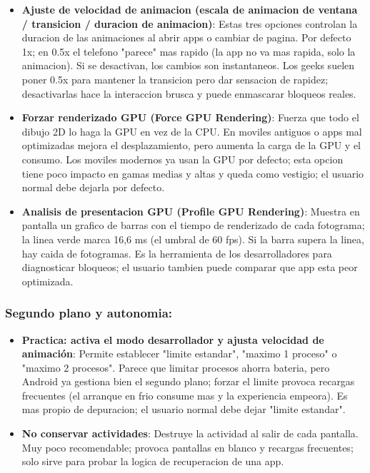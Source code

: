 \begin{itemize}
  \item \textbf{Ajuste de velocidad de animacion (escala de animacion de ventana / transicion / duracion de animacion)}: Estas tres opciones controlan la duracion de las animaciones al abrir apps o cambiar de pagina. Por defecto 1x; en 0.5x el telefono "parece" mas rapido (la app no va mas rapida, solo la animacion). Si se desactivan, los cambios son instantaneos. Los geeks suelen poner 0.5x para mantener la transicion pero dar sensacion de rapidez; desactivarlas hace la interaccion brusca y puede enmascarar bloqueos reales.
  \item \textbf{Forzar renderizado GPU (Force GPU Rendering)}: Fuerza que todo el dibujo 2D lo haga la GPU en vez de la CPU. En moviles antiguos o apps mal optimizadas mejora el desplazamiento, pero aumenta la carga de la GPU y el consumo. Los moviles modernos ya usan la GPU por defecto; esta opcion tiene poco impacto en gamas medias y altas y queda como vestigio; el usuario normal debe dejarla por defecto.
  \item \textbf{Analisis de presentacion GPU (Profile GPU Rendering)}: Muestra en pantalla un grafico de barras con el tiempo de renderizado de cada fotograma; la linea verde marca 16,6 ms (el umbral de 60 fps). Si la barra supera la linea, hay caida de fotogramas. Es la herramienta de los desarrolladores para diagnosticar bloqueos; el usuario tambien puede comparar que app esta peor optimizada.
\end{itemize}

\subsubsection*{Segundo plano y autonomia:}

\begin{itemize}
  \item \textbf{Practica: activa el modo desarrollador y ajusta velocidad de animación}: Permite establecer "limite estandar", "maximo 1 proceso" o "maximo 2 procesos". Parece que limitar procesos ahorra bateria, pero Android ya gestiona bien el segundo plano; forzar el limite provoca recargas frecuentes (el arranque en frio consume mas y la experiencia empeora). Es mas propio de depuracion; el usuario normal debe dejar "limite estandar".
  \item \textbf{No conservar actividades}: Destruye la actividad al salir de cada pantalla. Muy poco recomendable; provoca pantallas en blanco y recargas frecuentes; solo sirve para probar la logica de recuperacion de una app.
\end{itemize}

